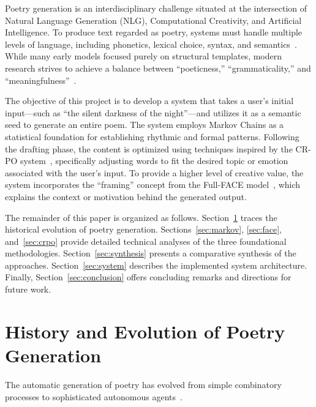 \documentclass[conference]{IEEEtran}
\begin{document}
Poetry generation is an interdisciplinary challenge situated at the intersection of Natural Language Generation (NLG), Computational Creativity, and Artificial Intelligence. To produce text regarded as poetry, systems must handle multiple levels of language, including phonetics, lexical choice, syntax, and semantics~\cite{oliveira2009survey}. While many early models focused purely on structural templates, modern research strives to achieve a balance between ``poeticness,'' ``grammaticality,'' and ``meaningfulness''~\cite{manurung2004thesis}.

The objective of this project is to develop a system that takes a user's initial input---such as ``the silent darkness of the night''---and utilizes it as a semantic seed to generate an entire poem. The system employs Markov Chains as a statistical foundation for establishing rhythmic and formal patterns. Following the drafting phase, the content is optimized using techniques inspired by the CR-PO system~\cite{popescu2022crpo}, specifically adjusting words to fit the desired topic or emotion associated with the user's input. To provide a higher level of creative value, the system incorporates the ``framing'' concept from the Full-FACE model~\cite{colton2012face}, which explains the context or motivation behind the generated output.

The remainder of this paper is organized as follows. Section~\ref{sec:history} traces the historical evolution of poetry generation. Sections~\ref{sec:markov}, \ref{sec:face}, and~\ref{sec:crpo} provide detailed technical analyses of the three foundational methodologies. Section~\ref{sec:synthesis} presents a comparative synthesis of the approaches. Section~\ref{sec:system} describes the implemented system architecture. Finally, Section~\ref{sec:conclusion} offers concluding remarks and directions for future work.


\section{History and Evolution of Poetry Generation}
\label{sec:history}

The automatic generation of poetry has evolved from simple combinatory processes to sophisticated autonomous agents~\cite{oliveira2009survey}.
\end{document}
